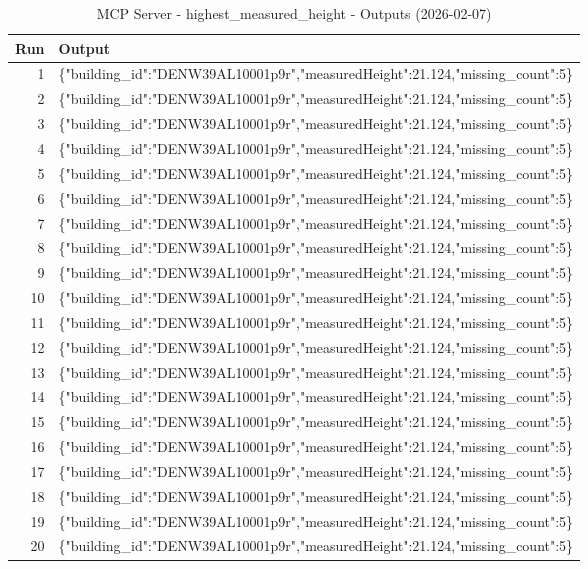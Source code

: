 \documentclass[a4paper,11pt]{article}
\begin{document}
\begin{table}[ht]
\centering
\scriptsize
\caption{MCP Server - highest\_measured\_height - Outputs (2026-02-07)}
\label{tab:mcp\_highest\_measured\_height\_outputs\_2026-02-07}
\begin{tabular}{r p{12cm}}
\hline
Run & Output \\
\hline
1 & \{"building\_id":"DENW39AL10001p9r","measuredHeight":21.124,"missing\_count":5\} \\
2 & \{"building\_id":"DENW39AL10001p9r","measuredHeight":21.124,"missing\_count":5\} \\
3 & \{"building\_id":"DENW39AL10001p9r","measuredHeight":21.124,"missing\_count":5\} \\
4 & \{"building\_id":"DENW39AL10001p9r","measuredHeight":21.124,"missing\_count":5\} \\
5 & \{"building\_id":"DENW39AL10001p9r","measuredHeight":21.124,"missing\_count":5\} \\
6 & \{"building\_id":"DENW39AL10001p9r","measuredHeight":21.124,"missing\_count":5\} \\
7 & \{"building\_id":"DENW39AL10001p9r","measuredHeight":21.124,"missing\_count":5\} \\
8 & \{"building\_id":"DENW39AL10001p9r","measuredHeight":21.124,"missing\_count":5\} \\
9 & \{"building\_id":"DENW39AL10001p9r","measuredHeight":21.124,"missing\_count":5\} \\
10 & \{"building\_id":"DENW39AL10001p9r","measuredHeight":21.124,"missing\_count":5\} \\
11 & \{"building\_id":"DENW39AL10001p9r","measuredHeight":21.124,"missing\_count":5\} \\
12 & \{"building\_id":"DENW39AL10001p9r","measuredHeight":21.124,"missing\_count":5\} \\
13 & \{"building\_id":"DENW39AL10001p9r","measuredHeight":21.124,"missing\_count":5\} \\
14 & \{"building\_id":"DENW39AL10001p9r","measuredHeight":21.124,"missing\_count":5\} \\
15 & \{"building\_id":"DENW39AL10001p9r","measuredHeight":21.124,"missing\_count":5\} \\
16 & \{"building\_id":"DENW39AL10001p9r","measuredHeight":21.124,"missing\_count":5\} \\
17 & \{"building\_id":"DENW39AL10001p9r","measuredHeight":21.124,"missing\_count":5\} \\
18 & \{"building\_id":"DENW39AL10001p9r","measuredHeight":21.124,"missing\_count":5\} \\
19 & \{"building\_id":"DENW39AL10001p9r","measuredHeight":21.124,"missing\_count":5\} \\
20 & \{"building\_id":"DENW39AL10001p9r","measuredHeight":21.124,"missing\_count":5\} \\
\hline
\end{tabular}
\end{table}
\end{document}
